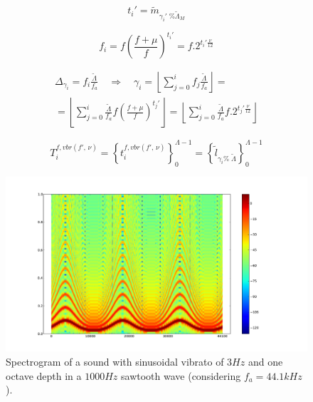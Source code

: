 \documentclass[
 aip,
 jmp,
 amsmath,amssymb,
 reprint,
]{revtex4-1}
\begin{document}
\begin{equation}\label{vbrAux}
 t_i'=\widetilde{m}_{\gamma_i' \;\% \widetilde{\Lambda}_M}
\end{equation}

\begin{equation}\label{vbrF}
 f_i=f \left ( \frac{f + \mu }{f} \right )^{t_i'}=f . 2^{t_i'\frac{\nu}{12}}
\end{equation}

\begin{multline}\label{vbrGamma2}
 \Delta_{\gamma_i}=f_i\frac{\widetilde{\Lambda}}{f_a} \quad \Rightarrow \quad \gamma_i = \left \lfloor \sum_{j=0}^{i} f_j \frac{\widetilde{\Lambda}}{f_a} \right \rfloor = \\ = \left \lfloor \sum_{j=0}^{i} \frac{\widetilde{\Lambda}}{f_a}f \left ( \frac{f + \mu }{f} \right )^{t_j'}  \right \rfloor= \left \lfloor \sum_{j=0}^{i} \frac{\widetilde{\Lambda}}{f_a}f . 2^{t_j'\frac{\nu}{12}}  \right \rfloor
\end{multline}

\begin{equation}\label{vbrT}
 T_i^{f, vbr(f',\,\nu)}=\left\{ t_i^{f,vbr(f',\,\nu)} \right\}_0^{\Lambda-1}=\left\{ \widetilde{l}_{\gamma_i \%\; \widetilde{\Lambda} } \right\}_0^{\Lambda-1}
\end{equation}

\begin{figure}[h!]
     \centering
         \includegraphics[width=\columnwidth]{figures/vibrato}
     \caption{Spectrogram of a sound with sinusoidal vibrato of $3Hz$ and one octave depth in a $1000Hz$ sawtooth wave (considering $f_a=44.1kHz$).}
         \label{fig:vibrato}
\end{figure}
\end{document}
